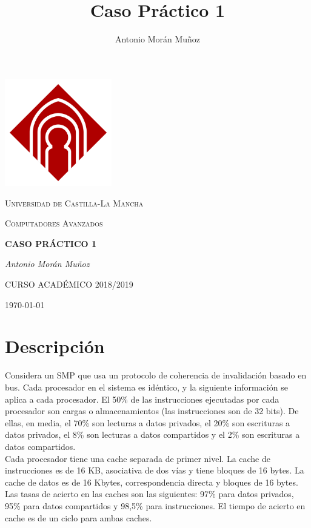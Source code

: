 \documentclass[12pt,a4paper]{article}
\author{Antonio Morán Muñoz}
\title{Caso Práctico 1}
\begin{document}
\begin{titlepage}
\thispagestyle{empty}
\centering
	\includegraphics[width=0.35\textwidth]{castilla.png}\par\vspace{1cm}
	{\scshape\LARGE Universidad de Castilla-La Mancha \par}
	\vspace{1cm}
	{\scshape\Large Computadores Avanzados\par}
	\vspace{1.5cm}
	{\huge\bfseries CASO PRÁCTICO 1\par}
	\vspace{2cm}
	{\Large\itshape Antonio Morán Muñoz\par}

	\vfill

	{CURSO ACADÉMICO 2018/2019}
	\vfill
	{\large \today\par}
\end{titlepage}

\thispagestyle{empty}
\tableofcontents
\newpage

\section{Descripción}
Considera un SMP que usa un protocolo de coherencia de invalidación basado en bus. Cada procesador en el sistema es idéntico, y la siguiente información se aplica a cada procesador. El 50\% de las instrucciones ejecutadas por cada procesador son cargas o almacenamientos (las instrucciones son de 32 bits). De ellas, en media, el 70\% son lecturas a datos privados, el 20\% son escrituras a datos privados, el 8\% son lecturas a datos compartidos y el 2\% son escrituras a datos compartidos.\\

Cada procesador tiene una cache separada de primer nivel. La cache de instrucciones es de 16 KB, asociativa de dos vías y tiene bloques de 16 bytes. La cache de datos es de 16 Kbytes, correspondencia directa y bloques de 16 bytes. Las tasas de acierto en las caches son las siguientes: 97\% para datos privados, 95\% para datos compartidos y 98,5\% para instrucciones. El tiempo de acierto en cache es de un ciclo para ambas caches.\\
\end{document}
